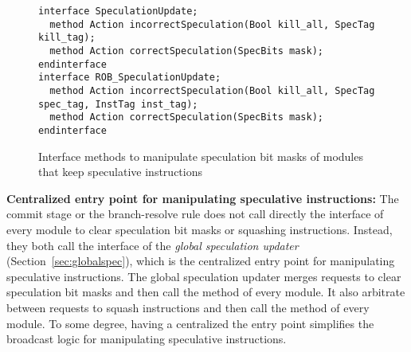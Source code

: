 \begin{figure}
\begin{lstlisting}[caption={}]
interface SpeculationUpdate;
  method Action incorrectSpeculation(Bool kill_all, SpecTag kill_tag);
  method Action correctSpeculation(SpecBits mask);
endinterface
interface ROB_SpeculationUpdate;
  method Action incorrectSpeculation(Bool kill_all, SpecTag spec_tag, InstTag inst_tag);
  method Action correctSpeculation(SpecBits mask);
endinterface
\end{lstlisting}
\caption{Interface methods to manipulate speculation bit masks of modules that keep speculative instructions}\label{fig:specupdate-ifc}
\end{figure}

\noindent\textbf{Centralized entry point for manipulating speculative instructions:}
The commit stage or the branch-resolve rule does not call directly the  interface of every module to clear speculation bit masks or squashing instructions.
Instead, they both call the interface of the \emph{global speculation updater} (Section~\ref{sec:globalspec}), which is the centralized entry point for manipulating speculative instructions.
The global speculation updater merges requests to clear speculation bit masks and then call the  method of every module.
It also arbitrate between requests to squash instructions and then call the  method of every module.
To some degree, having a centralized the entry point simplifies the broadcast logic for manipulating speculative instructions.


